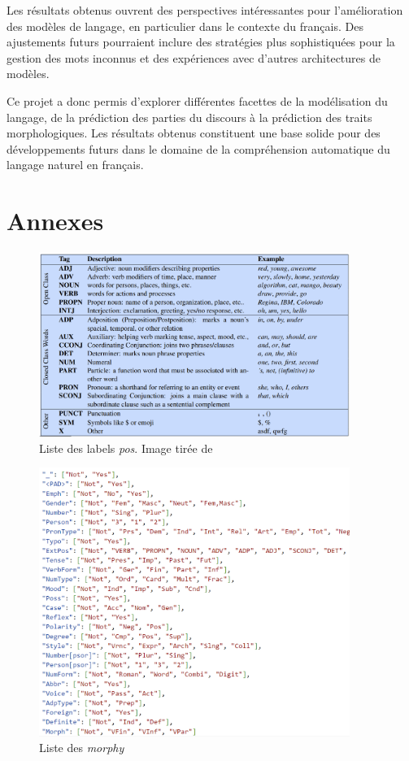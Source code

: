 \documentclass[a4paper]{article}
\begin{document}
Les résultats obtenus ouvrent des perspectives intéressantes pour l'amélioration des modèles de langage, en particulier dans le
contexte du français. Des ajustements futurs pourraient inclure des stratégies plus sophistiquées pour la gestion des mots
inconnus et des expériences avec d'autres architectures de modèles.

Ce projet a donc permis d'explorer différentes facettes de la modélisation du langage, de la prédiction des parties du discours à
la prédiction des traits morphologiques. Les résultats obtenus constituent une base solide pour des développements futurs dans le
domaine de la compréhension automatique du langage naturel en français.

\newpage

\section{Annexes}
\label{sec: Annexes}

\begin{figure}[H]
    \centering
    \includegraphics[width=0.9\textwidth]{all_pos.png}
    \caption{Liste des labels \textit{pos}. Image tirée de~\cite{pos}}
    \label{fig: all pos}
\end{figure}   

\begin{figure}[H]
    \centering
    \includegraphics[width=0.9\textwidth]{all_morphy.png}
    \caption{Liste des \textit{morphy}}
    \label{fig: all morphy}
\end{figure}  

\newpage

\printbibliography
\end{document}
